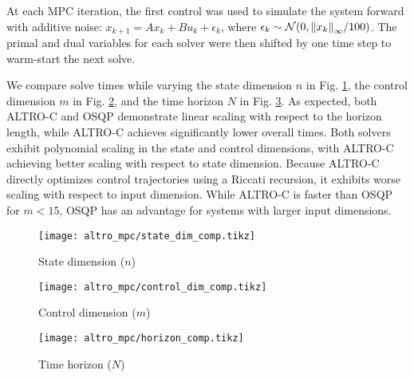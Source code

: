 \documentclass[../root.tex]{subfiles}
\begin{document}
At each MPC iteration, the first control was used to simulate the system
forward with additive noise: $x_{k+1} = A x_k + B u_k + \epsilon_k$, where
$\epsilon_k \sim \mathcal{N}(0,\norm{x_k}_\infty / 100)$. The primal and dual
variables for each solver were then shifted by one time step to warm-start
the next solve.

We compare solve times while varying the state dimension $n$ in Fig.
\ref{fig:state_dim_comp}, the control dimension $m$ in Fig.
\ref{fig:control_dim_comp}, and the time horizon $N$ in Fig.
\ref{fig:osqp_horizon_comp}. As expected, both ALTRO-C and OSQP demonstrate linear
scaling with respect to the horizon length, while ALTRO-C achieves
significantly lower overall times. Both solvers exhibit polynomial scaling in
the state and control dimensions, with ALTRO-C achieving better scaling with
respect to state dimension. Because ALTRO-C directly optimizes control
trajectories using a Riccati recursion, it exhibits worse scaling with
respect to input dimension. While ALTRO-C is faster than OSQP for $m < 15$,
OSQP has an advantage for systems with larger input dimensions.


\begin{figure*}
    \centering
    \begin{subfigure}{0.32\textwidth}
        \texttt{[image: altro\_mpc/state\_dim\_comp.tikz]}
        \caption{State dimension ($n$)}
        \label{fig:state_dim_comp}
    \end{subfigure}
    \begin{subfigure}{0.32\textwidth}
        \centering
        \texttt{[image: altro\_mpc/control\_dim\_comp.tikz]}
        \caption{Control dimension ($m$)}
        \label{fig:control_dim_comp}
    \end{subfigure}
    \begin{subfigure}{0.32\textwidth}
        \centering
        \texttt{[image: altro\_mpc/horizon\_comp.tikz]}
        \caption{Time horizon ($N$)}
        \label{fig:osqp_horizon_comp}
    \end{subfigure}
    \caption{Comparison of ALTRO-C and OSQP as a function of a) state dimension
    ($N=21,m=2$), b) control dimension ($N=21,n=30$), and c) horizon length
    ($n=12,m=6$). The x-axis is labeled at the sampled sizes.}
\end{figure*}
\end{document}
